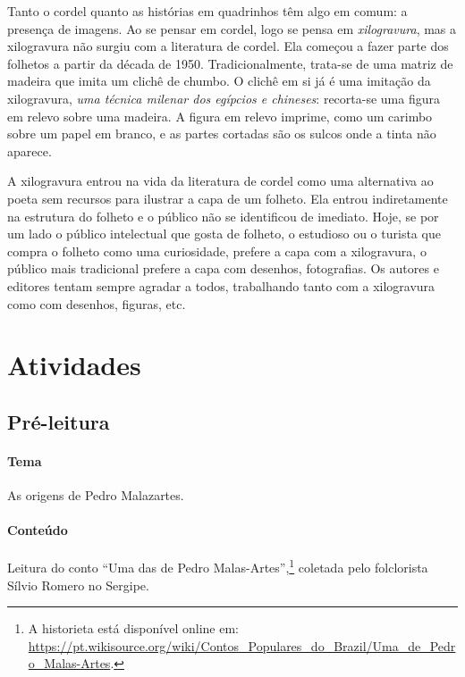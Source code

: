 \documentclass[11pt]{extarticle}
\begin{document}
Tanto o cordel quanto as histórias em quadrinhos têm algo em comum:
a presença de imagens. Ao se pensar em cordel, logo se pensa em \textit{xilogravura}, 
mas a xilogravura não surgiu com a literatura de cordel. Ela começou a fazer
parte dos folhetos a partir da década de 1950. Tradicionalmente, trata-se
de uma matriz de madeira que imita um clichê de chumbo. O clichê em si 
já é uma imitação da xilogravura, \textit{uma técnica milenar dos egípcios
e chineses}: recorta-se uma figura em relevo sobre uma madeira. A figura 
em relevo imprime, como um carimbo sobre um papel em branco, e as partes
cortadas são os sulcos onde a tinta não aparece. 

A xilogravura entrou na vida da literatura de cordel como uma alternativa 
ao poeta sem recursos para ilustrar a capa de um folheto. Ela entrou indiretamente na 
estrutura do folheto e o público não se identificou de imediato. Hoje, se por um lado 
o público intelectual que gosta de folheto, o estudioso ou o turista que compra o 
folheto como uma curiosidade, prefere a capa com a xilogravura, o público mais 
tradicional prefere a capa com desenhos, fotografias. 
Os autores e editores tentam sempre agradar a todos, trabalhando tanto com a xilogravura 
como com desenhos, figuras, etc.

\section{Atividades}

\subsection{Pré-leitura}



\paragraph{Tema} As origens de Pedro Malazartes.

\paragraph{Conteúdo} Leitura do conto ``Uma das de Pedro Malas-Artes'',\footnote{A historieta está disponível online em: \url{https://pt.wikisource.org/wiki/Contos_Populares_do_Brazil/Uma_de_Pedro_Malas-Artes}.} coletada pelo folclorista Sílvio Romero no Sergipe.
\end{document}
